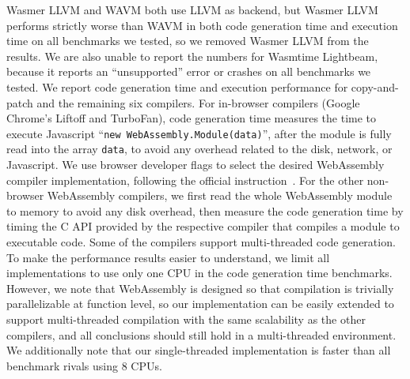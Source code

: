\documentclass[acmsmall,nonacm,screen]{acmart}\settopmatter{printfolios=true,printccs=true,printacmref=false}
\newcommand\code[1]{\lstinline[mathescape=true,basicstyle=\ttfamily\normalsize]|#1|}
\newcommand{\cp}{copy-and-patch}
\begin{document}
Wasmer LLVM and WAVM both use LLVM as backend, but Wasmer LLVM performs strictly worse than WAVM in both code generation time and execution time on all benchmarks we tested, so we removed Wasmer LLVM from the results. We are also unable to report the numbers for Wasmtime Lightbeam, because it reports an ``unsupported'' error or crashes on all benchmarks we tested. We report code generation time and execution performance for \cp{} and the remaining six compilers. For in-browser compilers (Google Chrome's Liftoff and TurboFan), code generation time measures the time to execute Javascript ``\code{new WebAssembly.Module(data)}'', after the module is fully read into the array \code{data}, to avoid any overhead related to the disk, network, or Javascript. We use browser developer flags to select the desired WebAssembly compiler implementation, following the official instruction~\cite{v8WasmFlagsBlog}. For the other non-browser WebAssembly compilers, we first read the whole WebAssembly module to memory to avoid any disk overhead, then measure the code generation time by timing the C API provided by the respective compiler that compiles a module to executable code. Some of the compilers support multi-threaded code generation. To make the performance results easier to understand, we limit all implementations to use only one CPU in the code generation time benchmarks. However, we note that WebAssembly is designed so that compilation is trivially parallelizable at function level, so our implementation can be easily extended to support multi-threaded compilation with the same scalability as the other compilers, and all conclusions should still hold in a multi-threaded environment. We additionally note that our single-threaded implementation is faster than all benchmark rivals using 8 CPUs.
\end{document}
